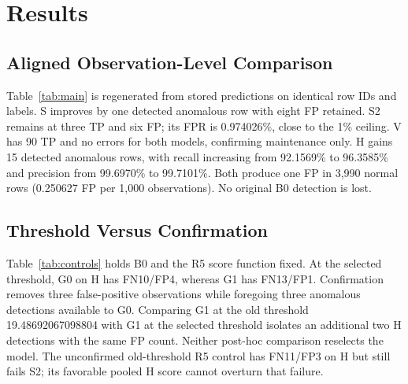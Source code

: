 \documentclass{article}
\begin{document}
\section{Results}
\subsection{Aligned Observation-Level Comparison}
Table~\ref{tab:main} is regenerated from stored predictions on identical row IDs and labels. S improves by one detected anomalous row with eight FP retained. S2 remains at three TP and six FP; its FPR is 0.974026\%, close to the 1\% ceiling. V has 90 TP and no errors for both models, confirming maintenance only. H gains 15 detected anomalous rows, with recall increasing from 92.1569\% to 96.3585\% and precision from 99.6970\% to 99.7101\%. Both produce one FP in 3,990 normal rows (0.250627 FP per 1,000 observations). No original B0 detection is lost.

\begin{table}[t]
\caption{Identical-row B0/G1 comparison. Counts are observations, not independent failures. FPR is percent; precision, recall and F-scores are proportions. S overlaps S1/S2. V and H are reused records, not independent new tests.}
\label{tab:main}\centering\small
\end{table}

\subsection{Threshold Versus Confirmation}
Table~\ref{tab:controls} holds B0 and the R5 score function fixed. At the selected threshold, G0 on H has FN10/FP4, whereas G1 has FN13/FP1. Confirmation removes three false-positive observations while foregoing three anomalous detections available to G0. Comparing G1 at the old threshold 19.48692067098804 with G1 at the selected threshold isolates an additional two H detections with the same FP count. Neither post-hoc comparison reselects the model. The unconfirmed old-threshold R5 control has FN11/FP3 on H but still fails S2; its favorable pooled H score cannot overturn that failure.

\begin{table}[t]
\caption{H controls on $N_0=3990,N_1=357$. ``New'' means selected $\theta$, not a newly tuned threshold. All controls are post-hoc frozen analyses.}
\label{tab:controls}\centering\small
\end{table}
\end{document}
